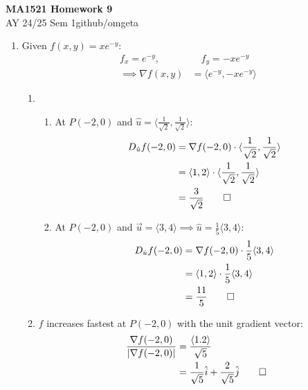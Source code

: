 \documentclass[12pt, a4paper]{article}
\newcommand{\mytitle}{MA1521 Homework 9}
\newcommand{\myauthor}{github/omgeta}
\newcommand{\mydate}{AY 24/25 Sem 1}
\begin{document}
\raggedright
\footnotesize
\begin{center}
{\normalsize{\textbf{\mytitle}}} \\
{\footnotesize{\mydate\hspace{2pt}\textemdash\hspace{2pt}\myauthor}}
\end{center}

\begin{enumerate}[Q\arabic*.]
  \item Given $f(x, y) = xe^{-y}$:
    \begin{align*}
      f_x = e^{-y},&\quad f_y = -xe^{-y}\\
      \implies \nabla f(x, y) &= \langle e^{-y}, -xe^{-y} \rangle
    \end{align*}
    
    \begin{enumerate}[(\alph*)]
      \item 
        \begin{enumerate}[(\roman*)]
          \item At $P(-2, 0)$ and $\hat{u} = \langle \frac{1}{\sqrt{2}}, \frac{1}{\sqrt{2}}\rangle$:
            \begin{align*}
              D_{\hat{u}}f(-2, 0) &= \nabla f(-2, 0) \cdot \langle \frac{1}{\sqrt{2}}, \frac{1}{\sqrt{2}}\rangle\\
                                  &= \langle 1, 2 \rangle \cdot \langle \frac{1}{\sqrt{2}}, \frac{1}{\sqrt{2}}\rangle\\
                                  &= \frac{3}{\sqrt{2}}\qed
            \end{align*}
          \item At $P(-2, 0)$ and $\vec{u} = \langle 3, 4\rangle \implies \hat{u} = \frac{1}{5}\langle 3, 4 \rangle$:
            \begin{align*}
              D_{\hat{u}}f(-2, 0) &= \nabla f(-2, 0) \cdot \frac{1}{5} \langle 3, 4\rangle\\
                                  &= \langle 1, 2 \rangle \cdot \frac{1}{5}\langle 3,4\rangle\\
                                  &= \frac{11}{5}\qed
            \end{align*}
        \end{enumerate}
      \item $f$ increases fastest at $P(-2, 0)$ with the unit gradient vector:
        \begin{align*}
          \frac{\nabla f(-2, 0)}{|\nabla f(-2, 0)|} &= \frac{\langle 1. 2\rangle}{\sqrt{5}}\\
                                                    &= \frac{1}{\sqrt{5}}\hat{i} + \frac{2}{\sqrt{5}}\hat{j} \qed
        \end{align*}
    \end{enumerate}


\end{enumerate}
\end{document}
